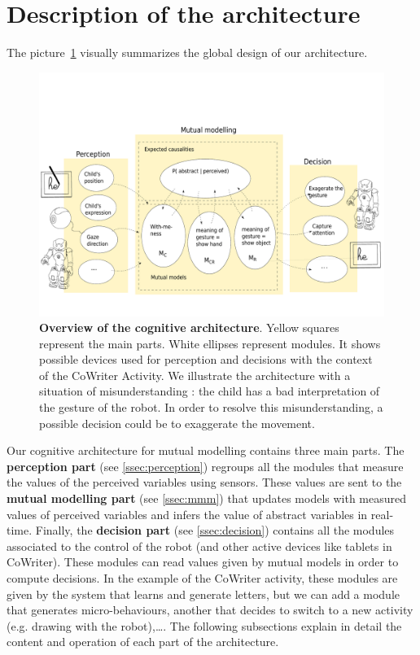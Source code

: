 \documentclass[conference]{IEEEtran}
\begin{document}
\section{Description of the architecture}
The picture~\ref{cog} visually summarizes the global design of our architecture. 

\begin{figure}[!]
\centering
\includegraphics[width=1\columnwidth]{cognitive_archi}
\caption{\small\textbf{Overview of the cognitive architecture}. Yellow squares represent the main parts.
White ellipses represent modules. 
It shows possible devices used for perception and decisions with the context of the CoWriter Activity. 
We illustrate the architecture with a situation of misunderstanding : the child has a bad interpretation of the gesture of the robot. 
In order to resolve this misunderstanding, a possible decision could be to exaggerate the movement. }
\label{cog}
\end{figure}
Our cognitive architecture for mutual modelling contains three main parts. 
The \textbf{perception part} (see \ref{ssec:perception}) regroups all the modules that measure the values of the perceived variables using sensors. 
These values are sent to the \textbf{mutual modelling part} (see \ref{ssec:mmm}) that updates models with measured values of perceived variables and infers the value of abstract variables in real-time. 
Finally, the \textbf{decision part} (see \ref{ssec:decision}) contains all the modules associated to the control of the robot (and other active devices like tablets in CoWriter). 
These modules can read values given by mutual models in order to compute decisions. 
In the example of the CoWriter activity, these modules are given by the system that learns and generate letters, but we can add a module that generates micro-behaviours, another that decides to switch to a new activity (e.g. drawing with the robot),\dots. 
The following subsections explain in detail the content and operation of each part of the architecture. 
\end{document}
